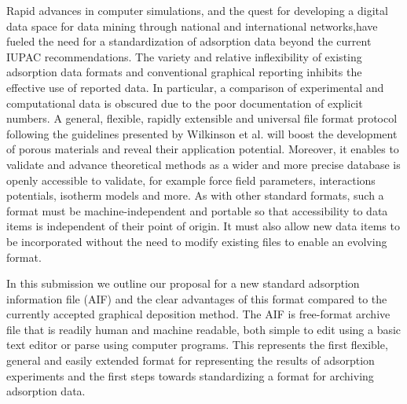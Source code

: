 \documentclass[journal=langd5,manuscript=article]{achemso}
\begin{document}
Rapid advances in computer simulations, and the quest for developing a digital data space for data mining through national and international networks,have fueled the need for a standardization of adsorption data beyond the current IUPAC recommendations.
The variety and relative inflexibility of existing adsorption data formats and conventional graphical reporting inhibits the effective use of reported data.
In particular, a comparison of experimental and computational data is obscured due to the poor documentation of explicit numbers.
A general, flexible, rapidly extensible and universal file format protocol following the guidelines presented by Wilkinson et al. will boost the development of porous materials and reveal their application potential.
Moreover, it enables to validate and advance theoretical methods as a wider and more precise database is openly accessible to validate, for example force field parameters, interactions potentials, isotherm models and more. 
As with other standard formats, such a format must be machine-independent and portable so that accessibility to data items is independent of their point of origin.
It must also allow new data items to be incorporated without the need to modify existing files to enable an evolving format.

In this submission we outline our proposal for a new standard adsorption information file (AIF) and the clear advantages of this format compared to the currently accepted graphical deposition method.
The AIF is free-format archive file that is readily human and machine readable, both simple to edit using a basic text editor or parse using computer programs.
This represents the first flexible, general and easily extended format for representing the results of adsorption experiments and the first steps towards standardizing a format for archiving adsorption data. 
\end{document}
